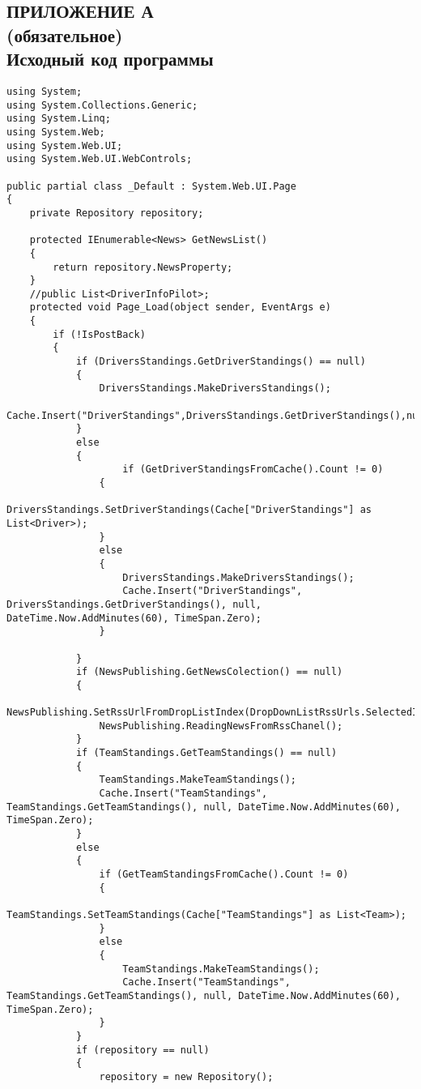 \documentclass[14pt,a4paper]{extreport}
\begin{document}
	\begin{landscape}
	\newpage
	\section*{\center\normalsize ПРИЛОЖЕНИЕ А\\(обязательное)\\Исходный код программы \endcenter}
	\scriptsize
	\begin{lstlisting}
using System;
using System.Collections.Generic;
using System.Linq;
using System.Web;
using System.Web.UI;
using System.Web.UI.WebControls;

public partial class _Default : System.Web.UI.Page
{
    private Repository repository;

    protected IEnumerable<News> GetNewsList()
    {
        return repository.NewsProperty;
    }
    //public List<DriverInfoPilot>;
    protected void Page_Load(object sender, EventArgs e)
    {
        if (!IsPostBack)
        {
            if (DriversStandings.GetDriverStandings() == null)
            {
                DriversStandings.MakeDriversStandings();
                Cache.Insert("DriverStandings",DriversStandings.GetDriverStandings(),null,DateTime.Now.AddMinutes(60),TimeSpan.Zero);                
            }
            else
            {
                    if (GetDriverStandingsFromCache().Count != 0)
                {
                    DriversStandings.SetDriverStandings(Cache["DriverStandings"] as List<Driver>);
                }
                else
                {
                    DriversStandings.MakeDriversStandings();
                    Cache.Insert("DriverStandings", DriversStandings.GetDriverStandings(), null, DateTime.Now.AddMinutes(60), TimeSpan.Zero);
                }               
                
            }
            if (NewsPublishing.GetNewsColection() == null)
            {
                NewsPublishing.SetRssUrlFromDropListIndex(DropDownListRssUrls.SelectedIndex);
                NewsPublishing.ReadingNewsFromRssChanel();
            }
            if (TeamStandings.GetTeamStandings() == null)
            {
                TeamStandings.MakeTeamStandings();
                Cache.Insert("TeamStandings", TeamStandings.GetTeamStandings(), null, DateTime.Now.AddMinutes(60), TimeSpan.Zero);
            }
            else
            {
                if (GetTeamStandingsFromCache().Count != 0)
                {
                    TeamStandings.SetTeamStandings(Cache["TeamStandings"] as List<Team>);
                }
                else
                {
                    TeamStandings.MakeTeamStandings();
                    Cache.Insert("TeamStandings", TeamStandings.GetTeamStandings(), null, DateTime.Now.AddMinutes(60), TimeSpan.Zero);
                }
            }
            if (repository == null)
            {
                repository = new Repository();


\end{lstlisting}
\end{landscape}
\end{document}
